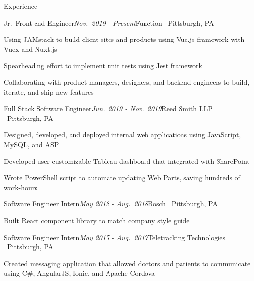 \documentclass{resume} %
\begin{document}

\begin{rSection}{Experience}

\begin{rSubsection}{Jr.\ Front-end Engineer}{\em Nov.\ 2019 - Present}{Function \textbar \ Pittsburgh, PA}{}
\item Using JAMstack to build client sites and products using Vue.js framework with Vuex and Nuxt.js
\item Spearheading effort to implement unit tests using Jest framework
\item Collaborating with product managers, designers, and backend engineers to build, iterate, and ship new features
\end{rSubsection}


\begin{rSubsection}{Full Stack Software Engineer}{\em Jun.\ 2019 - Nov.\ 2019}{Reed Smith LLP \textbar \ Pittsburgh, PA}{}
\item Designed, developed, and deployed internal web applications using JavaScript, MySQL, and ASP
\item Developed user-customizable Tableau dashboard that integrated with SharePoint
\item Wrote PowerShell script to automate updating Web Parts, saving hundreds of work-hours
\end{rSubsection}


\begin{rSubsection}{Software Engineer Intern}{\em May 2018 - Aug.\ 2018}{Bosch \textbar \ Pittsburgh, PA}{}
\item Built React component library to match company style guide
\end{rSubsection}


\begin{rSubsection}{Software Engineer Intern}{\em May 2017 - Aug.\ 2017}{Teletracking Technologies \textbar \ Pittsburgh, PA}{}
\item Created messaging application that allowed doctors and patients to communicate using C\#, AngularJS, Ionic, and Apache Cordova
\end{rSubsection}

\end{rSection}
\end{document}
